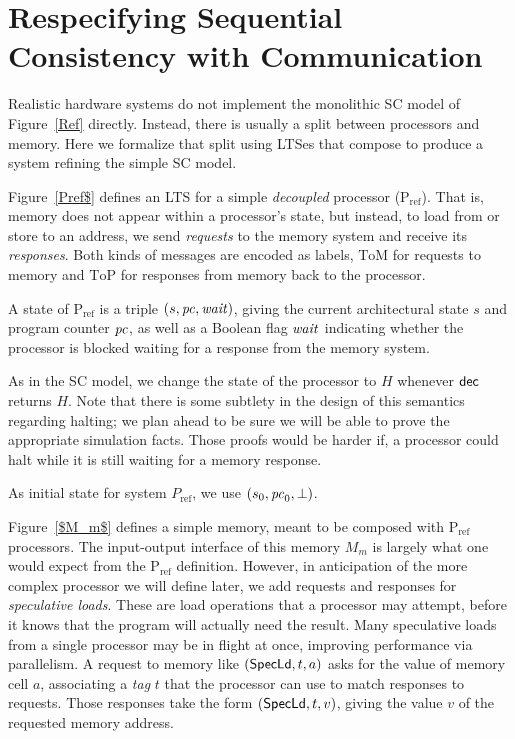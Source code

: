 \section{Respecifying Sequential Consistency with Communication}\label{sec:ref}

Realistic hardware systems do not implement the monolithic SC model of
Figure~\ref{Ref} directly.  Instead, there is usually a split between
processors and memory. Here we formalize that split using LTSes that 
compose to produce a system refining the simple SC model.

Figure~\ref{Pref$} defines an LTS for a simple \emph{decoupled} processor
(P$_\text{ref}$).  That is, memory does not appear within a processor's state, but
instead, to load from or store to an address, we send \emph{requests} to the
memory system and receive its \emph{responses}.  Both kinds of messages are
encoded as labels, $\text{ToM}$ for requests to memory and $\text{ToP}$ for
responses from memory back to the processor.

A state of P$_{\text{ref}}$ is a triple $(s, \mathit{pc}, \mathit{wait})$, giving the current architectural
state $s$ and program counter $\mathit{pc}$, as well as a Boolean flag $\mathit{wait}$
indicating whether the processor is blocked waiting for a response from the
memory system.

As in the SC model, we change the state of the processor to $H$ whenever
$\mathsf{dec}$ returns $H$.  Note that there is some subtlety in the design of
this semantics regarding halting; we plan ahead to be sure we will be able to prove the
appropriate simulation facts.  Those proofs would be harder if, \eg{}
a processor could halt while it is still waiting for a memory response.

As initial state for system $P_\text{ref}$, we use $(s_0, \mathit{pc}_0, \bot)$.


Figure~\ref{$M_m$} defines a simple memory, meant to be composed with P$_{\text{ref}}$
processors.  The input-output interface of this memory $M_m$ is largely what
one would expect from the P$_{\text{ref}}$ definition.  However, in anticipation of the
more complex processor we will define later, we add requests and responses for
\emph{speculative loads}.  These are load operations that a processor may
attempt, before it knows that the program will actually need the result.  Many
speculative loads from a single processor may be in flight at once, improving
performance via parallelism.  A request to memory like $(\mathsf{Spec}\mathsf{Ld}, t, a)$ asks
for the value of memory cell $a$, associating a \emph{tag} $t$ that the
processor can use to match responses to requests.  Those responses take the
form $(\mathsf{Spec}\mathsf{Ld}, t, v)$, giving the value $v$ of the requested memory address.

